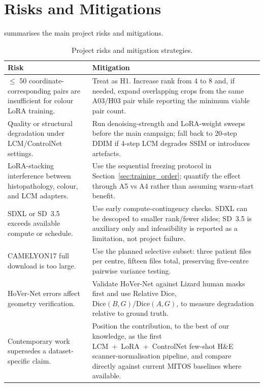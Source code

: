 \documentclass[a4paper,twoside,12pt]{report}
\begin{document}
\section{Risks and Mitigations}
\label{sec:risks}

 summarises the main project risks and mitigations.

\begin{table}[H]
\centering
\small
\setlength{\tabcolsep}{4pt}
\renewcommand{\arraystretch}{1.12}
\caption{Project risks and mitigation strategies.}
\label{tab:risks}
\begin{tabularx}{\textwidth}{L{0.36\textwidth}Y}
\toprule
\textbf{Risk} & \textbf{Mitigation} \\
\midrule
$\leq$ 50 coordinate-corresponding pairs are insufficient for colour LoRA training. & Treat as H1. Increase rank from 4 to 8 and, if needed, expand overlapping crops from the same A03/H03 pair while reporting the minimum viable pair count. \\
\midrule
Quality or structural degradation under LCM/ControlNet settings. & Run denoising-strength and LoRA-weight sweeps before the main campaign; fall back to 20-step DDIM if 4-step LCM degrades SSIM or introduces artefacts. \\
\midrule
LoRA-stacking interference between histopathology, colour, and LCM adapters. & Use the sequential freezing protocol in Section~\ref{sec:training_order}; quantify the effect through A5 vs A4 rather than assuming warm-start benefit. \\
\midrule
SDXL or SD~3.5 exceeds available compute or schedule. & Use early compute-contingency checks. SDXL can be descoped to smaller rank/fewer slides; SD~3.5 is auxiliary only and infeasibility is reported as a limitation, not project failure. \\
\midrule
CAMELYON17 full download is too large. & Use the planned selective subset: three patient files per centre, fifteen files total, preserving five-centre pairwise variance testing. \\
\midrule
HoVer-Net errors affect geometry verification. & Validate HoVer-Net against Lizard human masks first and use Relative Dice, $\mathrm{Dice}(B,G)/\mathrm{Dice}(A,G)$, to measure degradation relative to ground truth. \\
\midrule
Contemporary work supersedes a dataset-specific claim. & Position the contribution, to the best of our knowledge, as the first LCM~+~LoRA~+~ControlNet few-shot H\&E scanner-normalisation pipeline, and compare directly against current MITOS baselines where available. \\
\bottomrule
\end{tabularx}
\end{table}
\newpage
\end{document}

